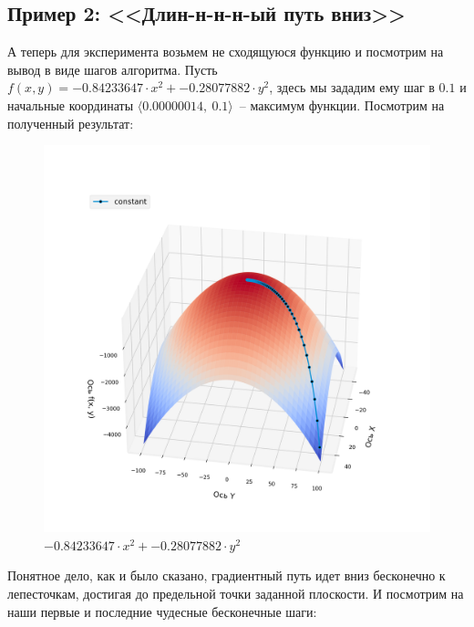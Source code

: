 \documentclass[12pt, a4paper, oneside, final]{article}
\begin{document}
	\subsection*{Пример 2: <<Длин-н-н-н-ый путь вниз>>}
	А теперь для эксперимента возьмем не сходящуюся функцию и посмотрим на вывод в виде шагов алгоритма. Пусть $f(x, y) = -0.84233647 \cdot x^{2} + -0.28077882 \cdot y^{2}$, здесь мы зададим ему шаг в $0.1$ и начальные координаты $\langle 0.00000014, ~ 0.1 \rangle$~-- максимум функции. Посмотрим на полученный результат:
	\begin{figure}[H]
		\centering
		\includegraphics[scale=0.48]{Image/T1_F2.png}
		\caption{$-0.84233647 \cdot x^{2} + -0.28077882 \cdot y^{2}$}
	\end{figure}
	Понятное дело, как и было сказано, градиентный путь идет вниз бесконечно к лепесточкам, достигая до предельной точки заданной плоскости. И посмотрим на наши первые и последние чудесные бесконечные шаги:
\end{document}
